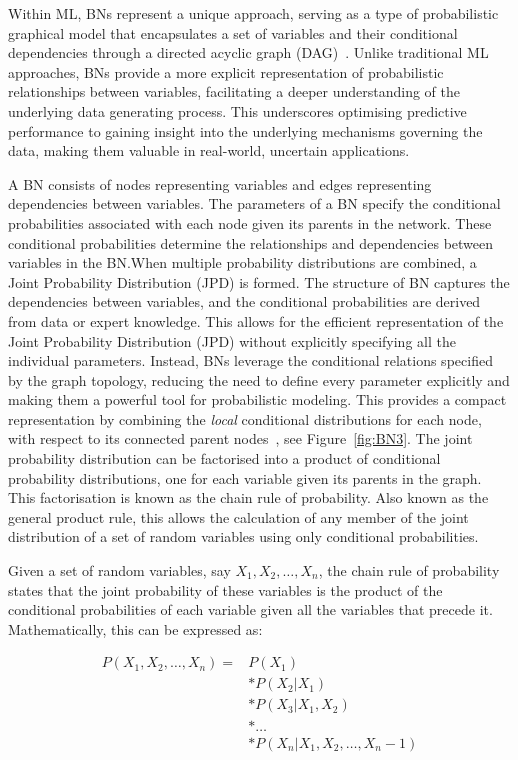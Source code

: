 \documentclass[journal]{IEEEtran}
\begin{document}
Within ML, BNs represent a unique approach, serving as a type of probabilistic graphical model that encapsulates a set of variables and their conditional dependencies through a directed acyclic graph (DAG)~\cite{Hand2001}. Unlike traditional ML approaches, BNs provide a more explicit representation of probabilistic relationships between variables, facilitating a deeper understanding of the underlying data generating process. This underscores optimising predictive performance to gaining insight into the underlying mechanisms governing the data, making them valuable in real-world, uncertain applications. 

A BN consists of nodes representing variables and edges representing dependencies between variables. The parameters of a BN specify the conditional probabilities associated with each node given its parents in the network. These conditional probabilities determine the relationships and dependencies between variables in the BN.\@ When multiple probability distributions are combined, a Joint Probability Distribution (JPD) is formed. The structure of BN captures the dependencies between variables, and the conditional probabilities are derived from data or expert knowledge. This allows for the efficient representation of the Joint Probability Distribution (JPD) without explicitly specifying all the individual parameters. Instead, BNs leverage the conditional relations specified by the graph topology, reducing the need to define every parameter explicitly and making them a powerful tool for probabilistic modeling. This provides a compact representation by combining the \textit{local} conditional distributions for each node, with respect to its connected parent nodes~\cite{Koller2009}, see Figure~\ref{fig:BN3}. The joint probability distribution can be factorised into a product of conditional probability distributions, one for each variable given its parents in the graph. This factorisation is known as the chain rule of probability. Also known as the general product rule, this allows the calculation of any member of the joint distribution of a set of random variables using only conditional probabilities.

Given a set of random variables, say $X_1, X_2, \ldots, X_n$, the chain rule of probability states that the joint probability of these variables is the product of the conditional probabilities of each variable given all the variables that precede it. Mathematically, this can be expressed as:

\begin{align}
    P(X_1, X_2, \ldots, X_n) = & P(X_1) \nonumber \\
    & * P(X_2 | X_1) \nonumber \\
    & * P(X_3 | X_1, X_2) \nonumber \\
    & * \ldots \nonumber \\
    & * P(X_n | X_1, X_2, \ldots, X_n-1)
    \label{eq:chain_rule}
\end{align}
    
\end{document}
